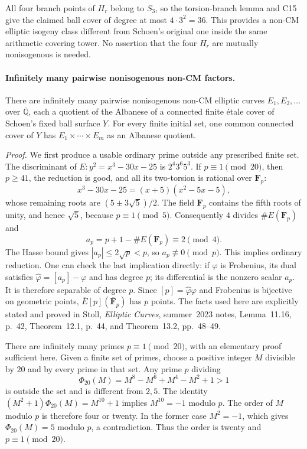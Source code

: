 \documentclass[11pt]{article}
\newcommand{\Q}{\mathbb Q}\newcommand{\C}{\mathbb C}\newcommand{\Z}{\mathbb Z}\newcommand{\R}{\mathbb R}\newcommand{\A}{\mathbb A}\newcommand{\OO}{\mathcal O}
\theoremstyle{definition}\newtheorem{definition}[theorem]{Definition}\newtheorem{remark}[theorem]{Remark}
\begin{document}
All four branch points of $H_r$ belong to $S_3$, so the torsion-branch
lemma and C15 give the claimed ball cover of degree at most
$4\cdot3^2=36$.  This provides a non-CM elliptic isogeny class different
from Schoen's original one inside the same arithmetic covering tower.
No assertion that the four $H_r$ are mutually nonisogenous is needed.

\paragraph{Infinitely many pairwise nonisogenous non-CM factors.}
There are infinitely many pairwise nonisogenous non-CM elliptic curves
$E_1,E_2,\ldots$ over $\overline{\Q}$, each a quotient of the Albanese of
a connected finite \'{e}tale cover of Schoen's fixed ball surface $Y$.
For every finite initial set, one common connected cover of $Y$ has
$E_1\times\cdots\times E_m$ as an Albanese quotient.

\emph{Proof.}
We first produce a usable ordinary prime outside any prescribed finite
set.  The discriminant of $E:y^2=x^3-30x-25$ is
$2^4 3^6 5^3$.  If $p\equiv1\pmod{20}$, then $p\geq41$, the reduction
is good, and all its two-torsion is rational over $\mathbf F_p$:
\[
 x^3-30x-25=(x+5)(x^2-5x-5),
\]
whose remaining roots are $(5\pm3\sqrt5)/2$.  The field $\mathbf F_p$
contains the fifth roots of unity, and hence $\sqrt5$, because
$p\equiv1\pmod5$.  Consequently $4$ divides $\#E(\mathbf F_p)$ and
\[
 a_p=p+1-\#E(\mathbf F_p)\equiv2\pmod4.
\]
The Hasse bound gives $|a_p|\leq2\sqrt p<p$, so $a_p\not\equiv0\pmod p$.
This implies ordinary reduction.  One can check the last implication
directly: if $\varphi$ is Frobenius, its dual satisfies
$\widehat\varphi=[a_p]-\varphi$ and has degree $p$; its differential is
the nonzero scalar $a_p$.  It is therefore separable of degree $p$.
Since $[p]=\widehat\varphi\varphi$ and Frobenius is bijective on geometric
points, $\overline E[p](\overline{\mathbf F}_p)$ has $p$ points.
The facts used here are explicitly stated and proved in Stoll,
\emph{Elliptic Curves}, summer~2023 notes, Lemma~11.16, p.~42,
Theorem~12.1, p.~44, and Theorem~13.2, pp.~48--49.

There are infinitely many primes $p\equiv1\pmod{20}$, with an elementary
proof sufficient here.  Given a finite set of primes, choose a positive
integer $M$ divisible by $20$ and by every prime in that set.  Any prime
$p$ dividing
\[
 \Phi_{20}(M)=M^8-M^6+M^4-M^2+1>1
\]
is outside the set and is different from $2,5$.  The identity
$(M^2+1)\Phi_{20}(M)=M^{10}+1$ implies $M^{10}=-1$ modulo $p$.
The order of $M$ modulo $p$ is therefore four or twenty.  In the former
case $M^2=-1$, which gives $\Phi_{20}(M)=5$ modulo $p$, a contradiction.
Thus the order is twenty and $p\equiv1\pmod{20}$.
\end{document}
